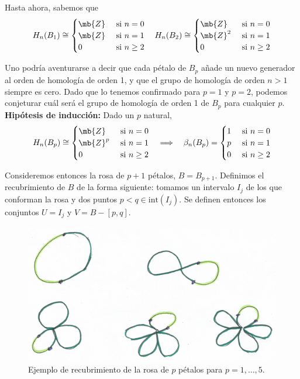 Hasta ahora, sabemos que
\[H_n(B_1)\cong
\begin{cases}
\mb{Z}		&\mbox{ si }n =0\\
\mb{Z}	&\mbox{ si }n =1\\
0     &\mbox{ si }n \geq 2
\end{cases}
\quad
H_n(B_2)\cong
\begin{cases}
\mb{Z}		&\mbox{ si }n =0\\
\mb{Z}^2	&\mbox{ si }n =1\\
0     &\mbox{ si }n \geq 2
\end{cases}
\]

Uno podría aventurarse a decir que cada pétalo de $B_p$ añade un nuevo generador al orden de homología de orden 1, y que el grupo de homología de orden $n > 1$ siempre es cero. Dado que lo tenemos confirmado para $p=1$ y $p=2$, podemos conjeturar cuál será el grupo de homología de orden 1 de $B_p$ para cualquier $p$.
\\

\textbf{Hipótesis de inducción:} Dado un $p$ natural,
\[\begin{array}{ccc}
H_n(B_p)\cong
\begin{cases}
\mb{Z}		&\mbox{ si }n =0\\
\mb{Z}^p	&\mbox{ si }n =1\\
0     &\mbox{ si }n \geq 2
\end{cases}
&\implies&
\beta_n(B_p)=
\begin{cases}
1 &\mbox{ si }n = 0\\
p &\mbox{ si }n = 1\\
0 &\mbox{ si }n \geq 2
\end{cases}
\end{array}\]

Consideremos entonces la rosa de $p+1$ pétalos, $B=B_{p+1}$. Definimos el recubrimiento de $B$ de la forma siguiente: tomamos un intervalo $I_j$ de los que conforman la rosa y dos puntos $p < q \in \mbox{int}(I_j)$. Se definen entonces los conjuntos $U=I_j$ y $V=B-[p,q]$.

\begin{figure}[h]
\centering
\includegraphics[scale=0.8]{Figures/Rosa}
\caption{Ejemplo de recubrimiento de la rosa de $p$ pétalos para $p=1,\dots,5$.}
\end{figure}

